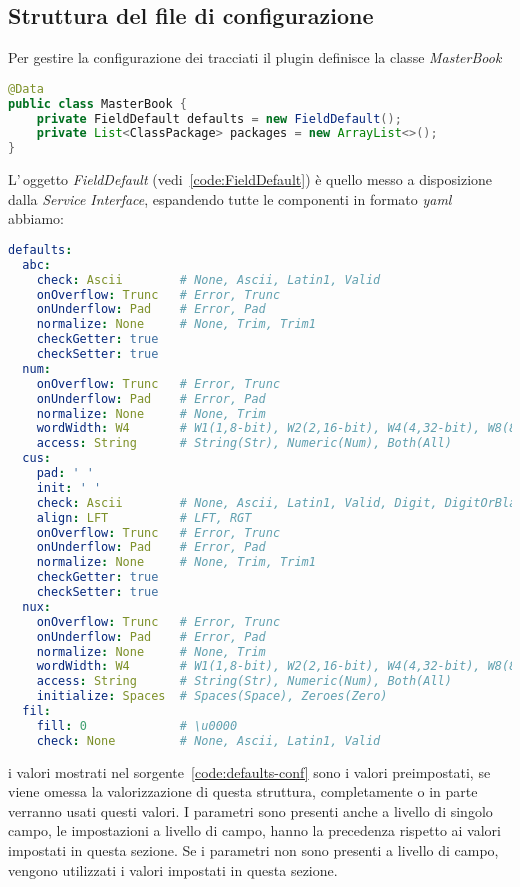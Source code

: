 \documentclass[a4paper,10pt]{report}
\begin{document}
\subsection{Struttura del file di configurazione}
Per gestire la configurazione dei tracciati il plugin definisce la classe
\textsl{MasterBook}

\begin{lstlisting}[language=java, caption=classe di configurazione MasterBook, 
label=code:MasterBook]
@Data
public class MasterBook {
    private FieldDefault defaults = new FieldDefault();
    private List<ClassPackage> packages = new ArrayList<>();
}
\end{lstlisting}

L'\,oggetto \textsl{FieldDefault} (vedi~\ref{code:FieldDefault}) è quello messo
a disposizione dalla \textsl{Service Interface}, espandendo tutte le componenti
in formato \textit{yaml} abbiamo:

\begin{lstlisting}[language=yaml, caption={configurazione, area default campi}, 
label=code:defaults-conf]
defaults:
  abc:
    check: Ascii        # None, Ascii, Latin1, Valid
    onOverflow: Trunc   # Error, Trunc
    onUnderflow: Pad    # Error, Pad
    normalize: None     # None, Trim, Trim1
    checkGetter: true
    checkSetter: true
  num:
    onOverflow: Trunc   # Error, Trunc
    onUnderflow: Pad    # Error, Pad
    normalize: None     # None, Trim
    wordWidth: W4       # W1(1,8-bit), W2(2,16-bit), W4(4,32-bit), W8(8,64-bit)
    access: String      # String(Str), Numeric(Num), Both(All)
  cus:
    pad: ' '
    init: ' '
    check: Ascii        # None, Ascii, Latin1, Valid, Digit, DigitOrBlank
    align: LFT          # LFT, RGT
    onOverflow: Trunc   # Error, Trunc
    onUnderflow: Pad    # Error, Pad
    normalize: None     # None, Trim, Trim1
    checkGetter: true
    checkSetter: true
  nux:
    onOverflow: Trunc   # Error, Trunc
    onUnderflow: Pad    # Error, Pad
    normalize: None     # None, Trim
    wordWidth: W4       # W1(1,8-bit), W2(2,16-bit), W4(4,32-bit), W8(8,64-bit)
    access: String      # String(Str), Numeric(Num), Both(All)
    initialize: Spaces  # Spaces(Space), Zeroes(Zero)
  fil:
    fill: 0             # \u0000
    check: None         # None, Ascii, Latin1, Valid

\end{lstlisting}
i valori mostrati nel sorgente~\ref{code:defaults-conf} sono i valori 
preimpostati, se viene omessa la valorizzazione di questa struttura, 
completamente o in parte verranno usati questi valori.
I parametri sono presenti anche a livello di singolo campo, le impostazioni a 
livello di campo, hanno la precedenza rispetto ai valori impostati in questa
sezione. Se i parametri non sono presenti a livello di campo, vengono utilizzati
i valori impostati in questa sezione.
\end{document}
